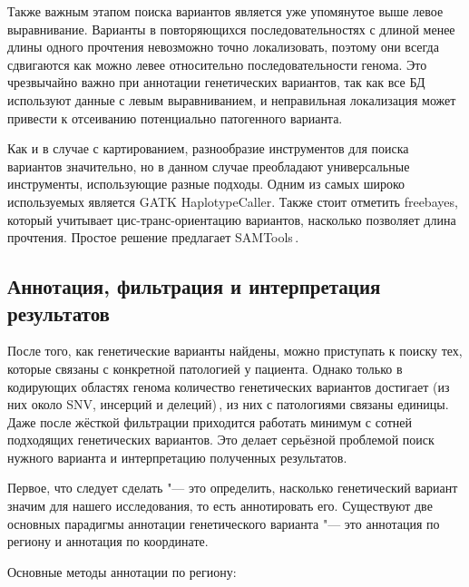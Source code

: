 \documentclass[12pt, twoside, a4paper]{article}
\newcommand{\thousands}{тыс.}
\newcommand{\utilname}[1]{\textenglish{#1}}
\begin{document}
Также важным этапом поиска вариантов является уже упомянутое выше левое выравнивание.
Варианты в повторяющихся последовательностях с длиной менее длины одного прочтения невозможно точно локализовать, поэтому они всегда сдвигаются как можно левее относительно последовательности генома.
Это чрезвычайно важно при аннотации генетических вариантов, так как все БД используют данные с левым выравниванием, и неправильная локализация может привести к отсеиванию потенциально патогенного варианта.

Как и в случае с картированием, разнообразие инструментов для поиска вариантов значительно, но в данном случае преобладают универсальные инструменты, использующие разные подходы.
Одним из самых широко используемых является \utilname{GATK HaplotypeCaller}.
Также стоит отметить \utilname{freebayes}, который учитывает цис-транс-ориентацию вариантов, насколько позволяет длина прочтения\cite{Garrison_2012}.
Простое решение предлагает \utilname{SAMTools}\,\citep{Li_2009_SAMTools}.

\subsection*{Аннотация, фильтрация и интерпретация результатов}

После того, как генетические варианты найдены, можно приступать к поиску тех, которые связаны с конкретной патологией у пациента.
Однако только в кодирующих областях генома количество генетических вариантов достигает \numprint[\thousands]{100} (из них около  SNV,  инсерций и  делеций)\,\cite{Supernat_2018}, из них с патологиями связаны единицы.
Даже после жёсткой фильтрации приходится работать минимум с сотней подходящих генетических вариантов.
Это делает серьёзной проблемой поиск нужного варианта и интерпретацию полученных результатов.

Первое, что следует сделать "--- это определить, насколько генетический вариант значим для нашего исследования, то есть аннотировать его.
Существуют две основных парадигмы аннотации генетического варианта "--- это аннотация по региону и аннотация по координате.

Основные методы аннотации по региону:
\end{document}
